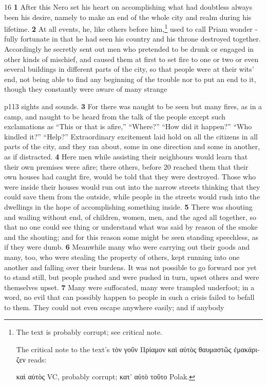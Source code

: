 16
\textbf{1} After this Nero set his heart on accomplishing what had doubtless always been his desire, namely to make an end of the whole city and realm during his lifetime. \textbf{2} At all events, he, like others before him,\texthebrew{⁠}\footnote{The text is probably corrupt; see critical note.

The critical note to the text's \textgreek{τ\texthebrew{ὸ}ν γο\texthebrew{ῦ}ν Πρίαμον κα\texthebrew{ὶ} α\texthebrew{ὐ}τ\texthebrew{ὸ}ς θαυμαστ\texthebrew{ῶ}ς \texthebrew{ἐ}μακάριζεν} reads:

\textgreek{κα\texthebrew{ὶ} α\texthebrew{ὐ}τ\texthebrew{ὸ}ς} VC, probably corrupt; \textgreek{κατ\texthebrew{}’ α\texthebrew{ὐ}τ\texthebrew{ὸ} το\texthebrew{ῦ}το} Polak.

} used to call Priam wonder ­fully fortunate in that he had seen his country and his throne destroyed together. Accordingly he secretly sent out men who pretended to be drunk or engaged in other kinds of mischief, and caused them at first to set fire to one or two or even several buildings in different parts of the city, so that people were at their wits' end, not being able to find any beginning of the trouble nor to put an end to it, though they constantly were aware of many strange

p113 sights and sounds. \textbf{3} For there was naught to be seen but many fires, as in a camp, and naught to be heard from the talk of the people except such exclamations as ``This or that is afire,'' ``Where?'' ``How did it happen?'' ``Who kindled it?'' ``Help?'' Extraordinary excitement laid hold on all the citizens in all parts of the city, and they ran about, some in one direction and some in another, as if distracted. \textbf{4} Here men while assisting their neighbours would learn that their own premises were afire; there others, before 20 reached them that their own houses had caught fire, would be told that they were destroyed. Those who were inside their houses would run out into the narrow streets thinking that they could save them from the outside, while people in the streets would rush into the dwellings in the hope of accomplishing something inside. \textbf{5} There was shouting and wailing without end, of children, women, men, and the aged all together, so that no one could see thing or understand what was said by reason of the smoke and the shouting; and for this reason some might be seen standing speechless, as if they were dumb. \textbf{6} Meanwhile many who were carrying out their goods and many, too, who were stealing the property of others, kept running into one another and falling over their burdens. It was not possible to go forward nor yet to stand still, but people pushed and were pushed in turn, upset others and were themselves upset. \textbf{7} Many were suffocated, many were trampled underfoot; in a word, no evil that can possibly happen to people in such a crisis failed to befall to them. They could not even escape anywhere easily; and if anybody

